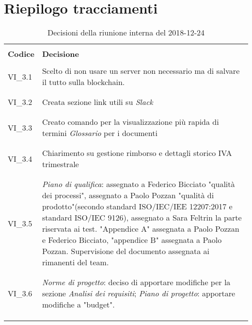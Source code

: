 \section{Riepilogo tracciamenti}
\begin{centering}
\begin{longtable}{ >{\centering}p{4cm} >{\centering}p{11cm} }

\hline
\\[0.5pt]
	\textbf{Codice} & \textbf{Decisione} 
	
	\tabularnewline 
	\hline
						
				\\[0.5pt]
				VI\_3.1 & Scelto di non usare un server non necessario ma di salvare il tutto sulla blockchain.
				\\[0.5pt]
				\tabularnewline
				\hline
				
				\\[0.5pt]
				VI\_3.2 & Creata sezione link utili su \textit{Slack}
				\\[0.5pt]
				\tabularnewline
				\hline
				
				\\[0.5pt]				
				VI\_3.3 & Creato comando per la visualizzazione più rapida di termini \textit{Glossario} per i documenti
				\\[0.5pt]
				\tabularnewline
				\hline
				
				\\[0.5pt]
				VI\_3.4 & Chiarimento su gestione rimborso e dettagli storico IVA trimestrale
				\\[0.5pt]
				\tabularnewline
				\hline
				
				\\[0.5pt]
				VI\_3.5 & \textit{Piano di qualifica}: assegnato a Federico Bicciato "qualità dei processi", assegnato a Paolo Pozzan "qualità di prodotto"(secondo standard ISO/IEC/IEE 12207:2017 e standard ISO/IEC 9126), assegnato a Sara Feltrin la parte riservata ai test. "Appendice A" assegnata a Paolo Pozzan e Federico Bicciato, "appendice B" assegnata a Paolo Pozzan. Supervisione del documento assegnata ai rimanenti del team.
				\\[0.5pt]
				\tabularnewline
				\hline
		
				\\[0.5pt]
				VI\_3.6 & \textit{Norme di progetto}: deciso di apportare modifiche per la sezione \textit{Analisi dei requisiti}; \textit{Piano di progetto}: apportare modifiche a "budget".
				\\[0.5pt]
				\tabularnewline
				\hline          	
                
        \\[0.7pt]
        \caption{Decisioni della riunione interna del 2018-12-24}
\end{longtable}
\end{centering}

